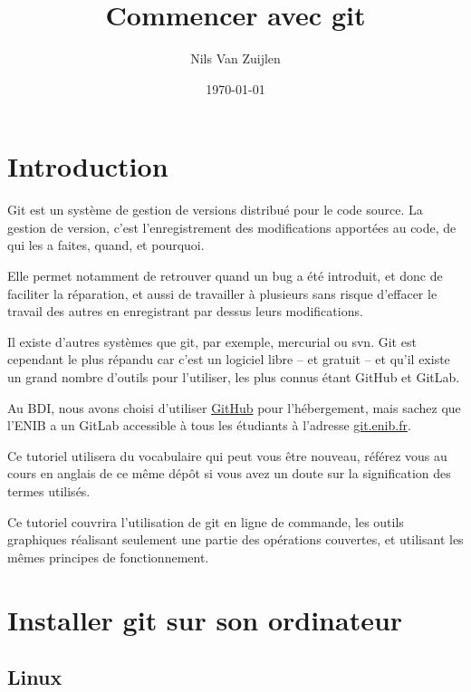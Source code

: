 \documentclass[10pt,a4paper,french]{article}
\title{Commencer avec git}
\author{Nils Van Zuijlen}
\date{\today}
\begin{document}
\maketitle

\section*{Introduction}

    Git est un système de gestion de versions distribué pour le code source. La gestion de version, c'est l'enregistrement des modifications apportées au code, de qui les a faites, quand, et pourquoi.

    Elle permet notamment de retrouver quand un bug a été introduit, et donc de faciliter la réparation, et aussi de travailler à plusieurs sans risque d'effacer le travail des autres en enregistrant par dessus leurs modifications.

    Il existe d'autres systèmes que git, par exemple, mercurial ou svn. Git est cependant le plus répandu car c'est un logiciel libre -- et gratuit -- et qu'il existe un grand nombre d'outils pour l'utiliser, les plus connus étant GitHub et GitLab.

    Au BDI, nous avons choisi d'utiliser \href{https://github.com}{GitHub} pour l'hébergement, mais sachez que l'ENIB a un GitLab accessible à tous les étudiants à l'adresse \href{https://git.enib.fr}{git.enib.fr}.

    Ce tutoriel utilisera du vocabulaire qui peut vous être nouveau, référez vous au cours en anglais de ce même dépôt si vous avez un doute sur la signification des termes utilisés.

    Ce tutoriel couvrira l'utilisation de git en ligne de commande, les outils graphiques réalisant seulement une partie des opérations couvertes, et utilisant les mêmes principes de fonctionnement.

\pagebreak
\tableofcontents
\pagebreak

\section{Installer git sur son ordinateur}

    \subsection{Linux}
\end{document}
